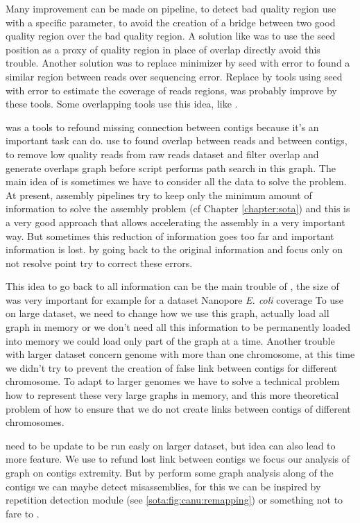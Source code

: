\documentclass[main.tex]{subfiles}
\begin{document}
Many improvement can be made on \yacrd pipeline, to detect bad quality region \yacrd use \minimap with a specific parameter, to avoid the creation of a bridge between two good quality region over the bad quality region. A solution like \miniscrub was to use the seed position as a proxy of quality region in place of overlap directly avoid this trouble. Another solution was to replace minimizer by seed with error to found a similar region between reads over sequencing error. Replace \minimap by tools using seed with error to estimate the coverage of reads regions, was probably improve by these tools. Some overlapping tools use this idea, like \cite{GroupK}. 

\knot was a tools to refound missing connection between contigs because it's an important task \knot can do. \knot use \minimap to found overlap between reads and between contigs, \yacrd to remove low quality reads from raw reads dataset and \fpa filter overlap and generate overlaps graph before \knot script performs path search in this graph. The main idea of \knot is sometimes we have to consider all the data to solve the problem. At present, assembly pipelines try to keep only the minimum amount of information to solve the assembly problem (cf Chapter \ref{chapter:sota}) and this is a very good approach that allows accelerating the assembly in a very important way. But sometimes this reduction of information goes too far and important information is lost. \knot by going back to the original information and focus only on not resolve point try to correct these errors.

\bigskip

This idea to go back to all information can be the main trouble of \knot, the size of \knot \OLC was very important for example for a dataset Nanopore \textit{E. coli} coverage 
To use \knot on large dataset, we need to change how we use this graph, actually \knot load all graph in memory or we don't need all this information to be permanently loaded into memory we could load only part of the graph at a time. Another trouble with larger dataset concern genome with more than one chromosome, at this time we didn't try to prevent the creation of false link between contigs for different chromosome. To adapt \knot to larger genomes we have to solve a technical problem how to represent these very large graphs in memory, and this more theoretical problem of how to ensure that we do not create links between contigs of different chromosomes.

\knot need to be update to be run easly on larger dataset, but \knot idea can also lead to more feature. We use \knot \OLC to refund lost link between contigs we focus our analysis of graph on contigs extremity. But by perform some graph analysis along of the contigs we can maybe detect misassemblies, for this we can be inspired by \canu repetition detection module (see \ref{sota:fig:canu:remapping}) or something not to fare to \cite{jackman2018tigmint}.
\end{document}
